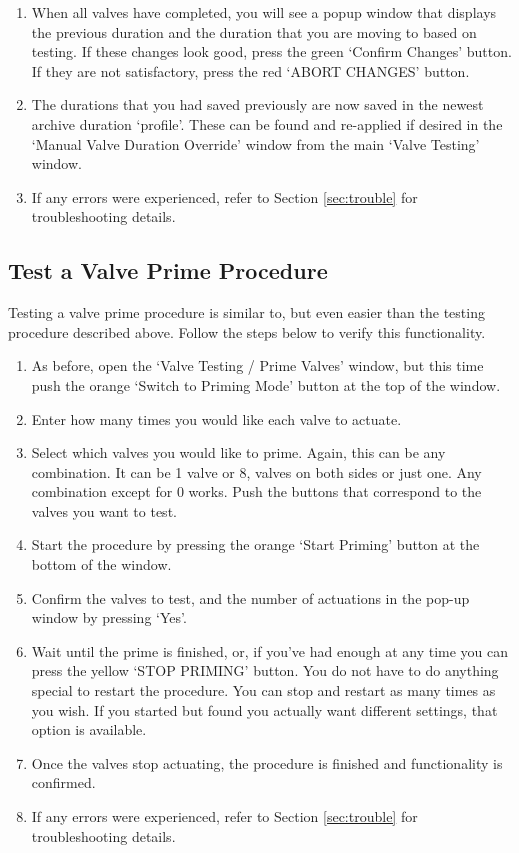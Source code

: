 \documentclass{article}
\begin{document}
\begin{enumerate}
    \item When all valves have completed, you will see a popup window that displays the previous duration
        and the duration that you are moving to based on testing. If these changes look good, press the 
        green `Confirm Changes' button. If they are not satisfactory, press the red `ABORT CHANGES' button.
    \item The durations that you had saved previously are now saved in the newest archive duration `profile'. These can be found and re-applied if desired in the `Manual 
        Valve Duration Override' window from the main `Valve Testing' window.
    \item If any errors were experienced, refer to Section \ref{sec:trouble} for troubleshooting details.
\end{enumerate}

\subsection{Test a Valve Prime Procedure}
Testing a valve prime procedure is similar to, but even easier than the testing procedure described above. Follow the steps below to verify this functionality.
\begin{enumerate}
    \item As before, open the `Valve Testing / Prime Valves' window, but this time push the orange `Switch to Priming Mode' button at the top of the window.
    \item Enter how many times you would like each valve to actuate.
    \item Select which valves you would like to prime. Again, this can be any combination. It can be 1 valve or 8, valves on both sides or just one. Any combination except for 0 works.
        Push the buttons that correspond to the valves you want to test.
    \item Start the procedure by pressing the orange `Start Priming' button at the bottom of the window.
    \item Confirm the valves to test, and the number of actuations in the pop-up window by pressing `Yes'.
    \item Wait until the prime is finished, or, if you've had enough at any time you can press the yellow `STOP PRIMING' button. You do not have to do anything special to restart the 
        procedure. You can stop and restart as many times as you wish. If you started but found you actually want different settings, that option is available.
    \item Once the valves stop actuating, the procedure is finished and functionality is confirmed.
    \item If any errors were experienced, refer to Section \ref{sec:trouble} for troubleshooting details.
\end{enumerate}
\end{document}
